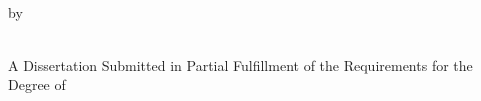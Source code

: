 \pagestyle{empty}
\begin{center}

\\

\vspace{1.7in}
by\\
\vspace{1.7in}

\\

\vspace{2in}
A Dissertation Submitted in Partial Fulfillment of the Requirements for the Degree of\\
\vspace{.2in}



\end{center}
